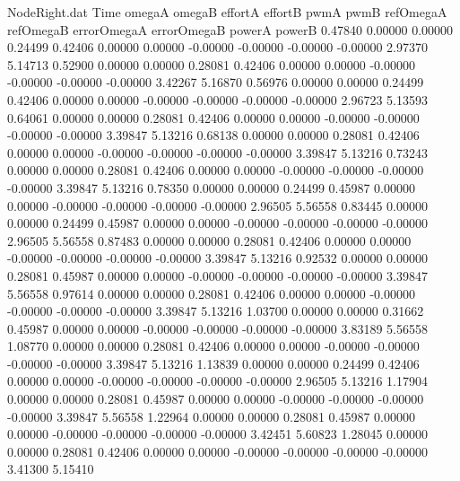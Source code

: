 \begin{filecontents}{NodeRight.dat}
Time omegaA omegaB effortA effortB pwmA pwmB refOmegaA refOmegaB errorOmegaA errorOmegaB powerA powerB
   0.47840    0.00000    0.00000     0.24499    0.42406    0.00000    0.00000   -0.00000   -0.00000   -0.00000   -0.00000    2.97370    5.14713
   0.52900    0.00000    0.00000     0.28081    0.42406    0.00000    0.00000   -0.00000   -0.00000   -0.00000   -0.00000    3.42267    5.16870
   0.56976    0.00000    0.00000     0.24499    0.42406    0.00000    0.00000   -0.00000   -0.00000   -0.00000   -0.00000    2.96723    5.13593
   0.64061    0.00000    0.00000     0.28081    0.42406    0.00000    0.00000   -0.00000   -0.00000   -0.00000   -0.00000    3.39847    5.13216
   0.68138    0.00000    0.00000     0.28081    0.42406    0.00000    0.00000   -0.00000   -0.00000   -0.00000   -0.00000    3.39847    5.13216
   0.73243    0.00000    0.00000     0.28081    0.42406    0.00000    0.00000   -0.00000   -0.00000   -0.00000   -0.00000    3.39847    5.13216
   0.78350    0.00000    0.00000     0.24499    0.45987    0.00000    0.00000   -0.00000   -0.00000   -0.00000   -0.00000    2.96505    5.56558
   0.83445    0.00000    0.00000     0.24499    0.45987    0.00000    0.00000   -0.00000   -0.00000   -0.00000   -0.00000    2.96505    5.56558
   0.87483    0.00000    0.00000     0.28081    0.42406    0.00000    0.00000   -0.00000   -0.00000   -0.00000   -0.00000    3.39847    5.13216
   0.92532    0.00000    0.00000     0.28081    0.45987    0.00000    0.00000   -0.00000   -0.00000   -0.00000   -0.00000    3.39847    5.56558
   0.97614    0.00000    0.00000     0.28081    0.42406    0.00000    0.00000   -0.00000   -0.00000   -0.00000   -0.00000    3.39847    5.13216
   1.03700    0.00000    0.00000     0.31662    0.45987    0.00000    0.00000   -0.00000   -0.00000   -0.00000   -0.00000    3.83189    5.56558
   1.08770    0.00000    0.00000     0.28081    0.42406    0.00000    0.00000   -0.00000   -0.00000   -0.00000   -0.00000    3.39847    5.13216
   1.13839    0.00000    0.00000     0.24499    0.42406    0.00000    0.00000   -0.00000   -0.00000   -0.00000   -0.00000    2.96505    5.13216
   1.17904    0.00000    0.00000     0.28081    0.45987    0.00000    0.00000   -0.00000   -0.00000   -0.00000   -0.00000    3.39847    5.56558
   1.22964    0.00000    0.00000     0.28081    0.45987    0.00000    0.00000   -0.00000   -0.00000   -0.00000   -0.00000    3.42451    5.60823
   1.28045    0.00000    0.00000     0.28081    0.42406    0.00000    0.00000   -0.00000   -0.00000   -0.00000   -0.00000    3.41300    5.15410

\end{filecontents}
